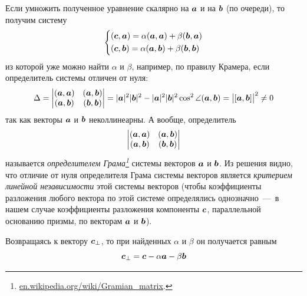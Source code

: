 \documentclass[a4paper,12pt]{article}
\begin{document}
\begin{solution}
    Если умножить полученное уравнение скалярно на $\boldsymbol a$ и на $\boldsymbol b$ (по очереди), то получим систему
    \[
      \left\{
        \begin{aligned}
          &(\boldsymbol c, \boldsymbol a) = \alpha (\boldsymbol a, \boldsymbol a) + \beta (\boldsymbol b, \boldsymbol a)\\
          &(\boldsymbol c, \boldsymbol b) = \alpha (\boldsymbol a, \boldsymbol b) + \beta (\boldsymbol b, \boldsymbol b)
        \end{aligned}
      \right.
    \]
    из которой уже можно найти $\alpha$ и $\beta$, например, по правилу Крамера, если определитель системы отличен от нуля:
    \[
      \Delta = \begin{vmatrix}
        (\boldsymbol a, \boldsymbol a) & (\boldsymbol a, \boldsymbol b)\\
        (\boldsymbol a, \boldsymbol b) & (\boldsymbol b, \boldsymbol b)
      \end{vmatrix}
      = |\boldsymbol a|^2 |\boldsymbol b|^2 - |\boldsymbol a|^2 |\boldsymbol b|^2 \cos^2 \angle{(\boldsymbol a, \boldsymbol b)}
      = \bigl|[\boldsymbol a, \boldsymbol b]\bigr|^2
      \not= 0
    \]
    так как векторы $\boldsymbol a$ и $\boldsymbol b$ неколлинеарны.
    А вообще, определитель
    \[
      \begin{vmatrix}
        (\boldsymbol a, \boldsymbol a) & (\boldsymbol a, \boldsymbol b)\\
        (\boldsymbol a, \boldsymbol b) & (\boldsymbol b, \boldsymbol b)
      \end{vmatrix}
    \]
    называется \emph{определителем Грама\footnote{\href{https://en.wikipedia.org/wiki/Gramian\_matrix}{en.wikipedia.org/wiki/Gramian\_matrix}.}} системы векторов $\boldsymbol a$ и $\boldsymbol b$.
    Из решения видно, что отличие от нуля определителя Грама системы векторов является \emph{критерием линейной независимости} этой системы векторов (чтобы коэффициенты разложения любого вектора по этой системе определялись однозначно~---~в нашем случае коэффициенты разложения компоненты $\boldsymbol c$, параллельной основанию призмы, по векторам $\boldsymbol a$ и $\boldsymbol b$).
    
    Возвращаясь к вектору $\boldsymbol c_{\perp}$, то при найденных $\alpha$ и $\beta$ он получается равным
    \[
      \boldsymbol c_{\perp} = \boldsymbol c - \alpha \boldsymbol a - \beta \boldsymbol b
    \]
  \end{solution}
\end{document}
